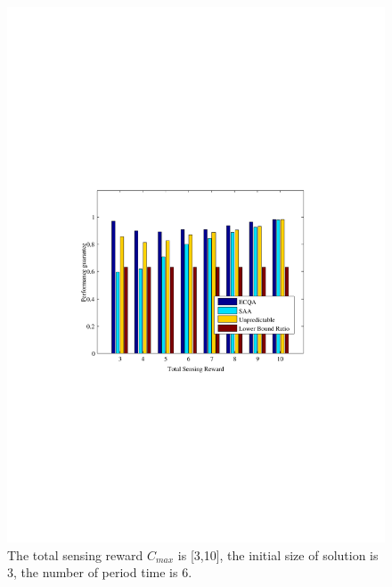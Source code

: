 \documentclass[journal]{IEEEtran}
\begin{document}
\begin{figure}[h]
	\centering
	\includegraphics[width=0.85\linewidth]{figure7.pdf}
	\caption{The total sensing reward $C_{max}$ is [3,10], the initial size of solution is 3, the number of period time is 6.}
	\label{fig:figure5}
\end{figure}
\end{document}
